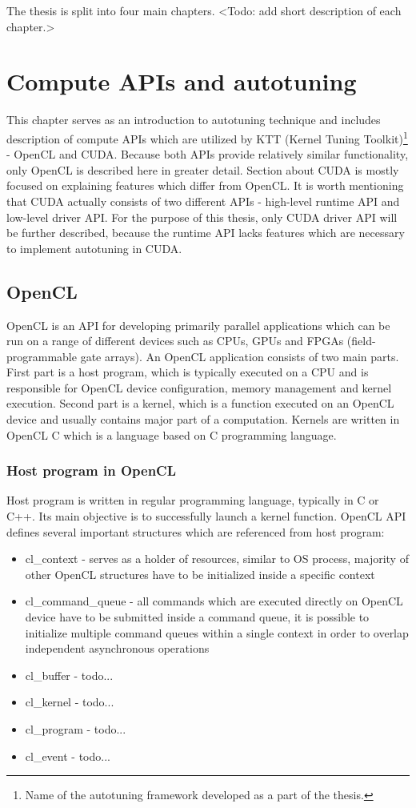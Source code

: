 \documentclass
[
    digital, %
    oneside, %
    table, %
    nolof, %
    nolot, %
    nocover %
]{fithesis3}
\begin{document}
The thesis is split into four main chapters. <Todo: add short description of each chapter.>

\chapter{Compute APIs and autotuning}
This chapter serves as an introduction to autotuning technique and includes description of compute APIs which are utilized by KTT (Kernel Tuning
Toolkit)\footnote{Name of the autotuning framework developed as a part of the thesis.} - OpenCL and CUDA. Because both APIs provide relatively similar
functionality, only OpenCL is described here in greater detail. Section about CUDA is mostly focused on explaining features which differ from OpenCL.
It is worth mentioning that CUDA actually consists of two different APIs - high-level runtime API and low-level driver API. For the purpose of this
thesis, only CUDA driver API will be further described, because the runtime API lacks features which are necessary to implement autotuning in CUDA.

\section{OpenCL}
OpenCL is an API for developing primarily parallel applications which can be run on a range of different devices such as CPUs, GPUs and FPGAs
(field-programmable gate arrays). An OpenCL application consists of two main parts. First part is a host program, which is typically executed on a CPU
and is responsible for OpenCL device configuration, memory management and kernel execution. Second part is a kernel, which is a function executed on
an OpenCL device and usually contains major part of a computation. Kernels are written in OpenCL C which is a language based on C programming
language.

\subsection{Host program in OpenCL}
Host program is written in regular programming language, typically in C or C++. Its main objective is to successfully launch a kernel function. OpenCL
API defines several important structures which are referenced from host program:
\begin{itemize}
    \item cl\_context - serves as a holder of resources, similar to OS process, majority of other OpenCL structures have to be initialized inside a
    specific context
    \item cl\_command\_queue - all commands which are executed directly on OpenCL device have to be submitted inside a command queue, it is possible
    to initialize multiple command queues within a single context in order to overlap independent asynchronous operations
    \item cl\_buffer - todo...
    \item cl\_kernel - todo...
    \item cl\_program - todo...
    \item cl\_event - todo...
\end{itemize}
\end{document}
